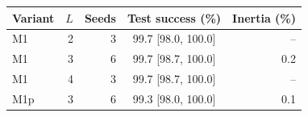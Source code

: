 \begin{tabular}{lrrcr}
\toprule
Variant & $L$ & Seeds & Test success (\%) & Inertia (\%) \\
\midrule
M1 & 2 & 3 & 99.7 [98.0, 100.0] & -- \\
M1 & 3 & 6 & 99.7 [98.7, 100.0] & 0.2 \\
M1 & 4 & 3 & 99.7 [98.7, 100.0] & -- \\
M1p & 3 & 6 & 99.3 [98.0, 100.0] & 0.1 \\
\bottomrule
\end{tabular}
